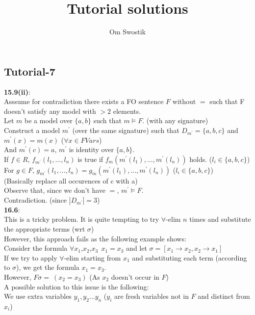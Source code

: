 \documentclass{article}
\title{\textbf{Tutorial solutions}}
\author{Om Swostik}
\date{}
\begin{document}
\maketitle
\begin{flushleft}
\section{Tutorial-7}
\textbf{15.9(ii)}: \\
Asssume for contradiction there exists a FO sentence $F$ without $=$ such that F doesn't satisfy any model with $> 2$ elements.\\
Let $m$ be a model over $\{a,b\}$ such that $m \models F$. (with any signature)\\
Construct a model $m^{'}$ (over the same signature) such that $D_{m^{'}}=\{a,b,c\}$ and $m^{'}(x)=m(x)$ ($\forall x\in FVars$)\\
And $m^{'}(c)=a$, $m^{'}$ is identity over $\{a,b\}$.\\
If $f\in R$, $f_{m^{'}}(l_1,\dots,l_n)$ is true if $f_m(m^{'}(l_1),\dots,m^{'}(l_n))$ holds. ($l_i \in \{a,b,c\}$)\\
For $g\in F$, $g_{m^{'}}(l_1,\dots,l_n)= g_m(m^{'}(l_1),\dots,m^{'}(l_n))$ ($l_i \in \{a,b,c\}$) \\
(Basically replace all occurences of c with a)\\
Observe that, since we don't have $=$, $m^{'}\models F$.\\
Contradiction. (since $|D_{m^{'}}|=3$)\\
\textbf{16.6}: \\
This is a tricky problem. It is quite tempting to try $\forall$-elim $n$ times and substitute the appropriate terms (wrt $\sigma$)\\
However, this approach fails as the following example shows:\\       
Consider the formula $\forall x_1\text{,}x_2\text{,}x_3\:\: x_1=x_3$ and let $\sigma= [x_1\rightarrow x_2,x_2\rightarrow x_1]$\\
If we try to apply $\forall$-elim starting from $x_1$ and substituting each term (according to $\sigma$), we get the formula $x_1=x_3$.\\
However, $F\sigma= \:(x_2=x_3)$  (As $x_2$ doesn't occur in $F$)\\
A possible solution to this issue is the following: \\
We use extra variables $y_1,y_2\dots y_n$  ($y_i$ are fresh variables not in $F$ and distinct from $x_i$)\\

\end{flushleft}
\end{document}

